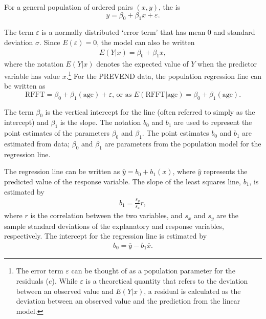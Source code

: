 For a general population of ordered pairs $(x,y)$, the  is
\[y = \beta_0 + \beta_1x + \varepsilon. \]

The term $\varepsilon$ is a normally distributed `error term' that has mean 0 and standard deviation $\sigma$. Since $E(\varepsilon) = 0$,  the model can also be written
\begin{align*}
	E(Y|x) = \beta_0 + \beta_1 x,
\end{align*}
where the notation $E(Y|x)$ denotes the expected value of $Y$ when the predictor variable has value $x$.\footnote{The error term $\varepsilon$ can be thought of as a population parameter for the residuals ($e$). While $\varepsilon$ is a theoretical quantity that refers to the deviation between an observed value and $E(Y|x)$, a residual is calculated as the deviation between an observed value and the prediction from the linear model.} For the PREVEND data, the population regression line can be written as
\[\text{RFFT} = \beta_0 + \beta_{1}(\text{age}) + \varepsilon, \, \text{or as }
 E (\text{RFFT}| \text{age}) = \beta_0 + \beta_{1}(\text{age}).\]

The term $\beta_0$ is the vertical intercept for the line (often referred to simply as the intercept) and $\beta_1$ is the slope. The notation $b_0$ and $b_1$ are used to represent the point estimates of the parameters $\beta_0$ and $\beta_1$. The point estimates $b_0$ and $b_1$ are estimated from data; $\beta_0$ and $\beta_1$ are parameters from the population model for the regression line.

The regression line can be written as $\hat{y} = b_0 + b_1(x)$, where $\hat{y}$ represents the predicted value of the response variable. The slope of the least squares line, $b_1$, is estimated by
\begin{align}
b_1 = \frac{s_y}{s_x} r,
\label{slopeOfLSRLine}
\end{align}
where $r$ is the correlation between the two variables, and $s_x$ and $s_y$ are the sample standard deviations of the explanatory and response variables, respectively. The intercept for the regression line is estimated by
\begin{align}
b_0 = \overline{y} - b_1\overline{x}.
\label{interceptOfLSRLine}
\end{align}

